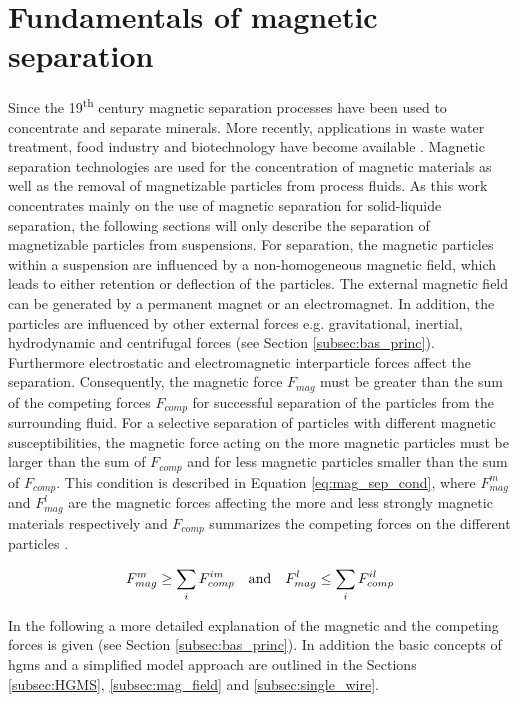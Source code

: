 \section{Fundamentals of magnetic separation}
\label{sec:Mag_sep}
Since the 19\textsuperscript{th} century magnetic separation processes have been used to concentrate and separate minerals. More recently, applications in waste water treatment, food industry and biotechnology have become available \cite{yavuz2009magnetic}. Magnetic separation technologies are used for the concentration of magnetic materials  as well as the removal of magnetizable particles from process fluids. As this work concentrates mainly on the use of magnetic separation for solid-liquide separation, the following sections will only describe the separation of magnetizable particles from suspensions. For separation, the magnetic particles within a suspension are influenced by a non-homogeneous magnetic field, which leads to either retention or deflection of the particles. The external magnetic field can be generated by a permanent magnet or an electromagnet. In addition, the particles are influenced by other external forces e.g. gravitational, inertial, hydrodynamic and centrifugal forces (see Section \ref{subsec:bas_princ}). Furthermore electrostatic and electromagnetic interparticle forces affect the separation. Consequently, the magnetic force $F_{mag}$ must be greater than the sum of the competing forces $F_{comp}$ for successful separation of the particles from the surrounding fluid. For a selective separation of particles with different magnetic susceptibilities, the magnetic force acting on the more magnetic particles must be larger than the sum of $F_{comp}$ and for less magnetic particles smaller than the sum of $F_{comp}$. This condition is described in Equation \ref{eq:mag_sep_cond}, where $F_{mag}^{m}$ and $F_{mag}^{l}$ are the magnetic forces affecting the more and less strongly magnetic materials respectively and $F_{comp}$ summarizes the competing forces on the different particles \cite{svoboda2004magnetic,oberteuffer1974magnetic}.   

\begin{equation}
\label{eq:mag_sep_cond}
\centering
F_{mag}^{m}\geq\sum_{i}F_{comp}^{im} \quad \textrm{and} \quad F_{mag}^{l}\leq\sum_{i}F_{comp}^{il}
\end{equation}

In the following a more detailed explanation of the magnetic and the competing forces is given (see Section \ref{subsec:bas_princ}). In addition the basic concepts of \gls{hgms} and a simplified model approach are outlined in the Sections \ref{subsec:HGMS}, \ref{subsec:mag_field} and \ref{subsec:single_wire}.  

